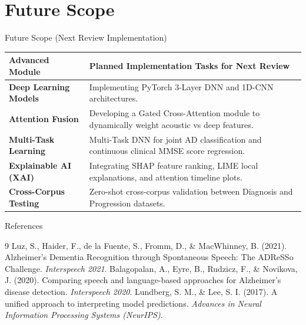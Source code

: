 \documentclass[aspectratio=169]{beamer}
\begin{document}
\section{Future Scope}
\begin{frame}{Future Scope (Next Review Implementation)}
    \begin{table}
    \centering
    \small
    \begin{tabular}{p{}p{}}
        \toprule
        \textbf{Advanced Module} & \textbf{Planned Implementation Tasks for Next Review} \\
        \midrule
        \textbf{Deep Learning Models} & Implementing PyTorch 3-Layer DNN and 1D-CNN architectures. \\
        \textbf{Attention Fusion} & Developing a Gated Cross-Attention module to dynamically weight acoustic vs deep features. \\
        \textbf{Multi-Task Learning} & Multi-Task DNN for joint AD classification and continuous clinical MMSE score regression. \\
        \textbf{Explainable AI (XAI)} & Integrating SHAP feature ranking, LIME local explanations, and attention timeline plots. \\
        \textbf{Cross-Corpus Testing} & Zero-shot cross-corpus validation between Diagnosis and Progression datasets. \\
        \bottomrule
    \end{tabular}
    \end{table}
\end{frame}

\begin{frame}{References}
    \begin{thebibliography}{9}
         Luz, S., Haider, F., de la Fuente, S., Fromm, D., \& MacWhinney, B. (2021). Alzheimer's Dementia Recognition through Spontaneous Speech: The ADReSSo Challenge. \textit{Interspeech 2021}.
         Balagopalan, A., Eyre, B., Rudzicz, F., \& Novikova, J. (2020). Comparing speech and language-based approaches for Alzheimer's disease detection. \textit{Interspeech 2020}.
         Lundberg, S. M., \& Lee, S. I. (2017). A unified approach to interpreting model predictions. \textit{Advances in Neural Information Processing Systems (NeurIPS)}.
    \end{thebibliography}
\end{frame}
\end{document}
